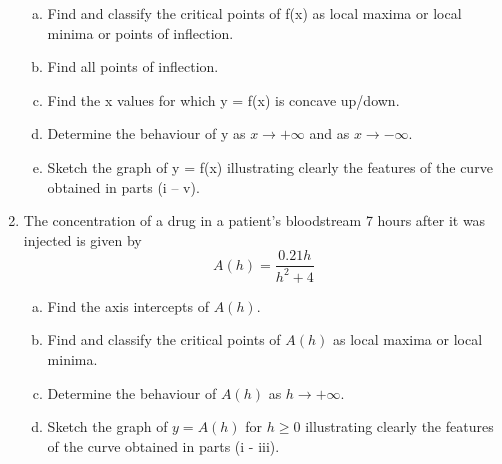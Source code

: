 \documentclass[a4paper,12pt]{article}
\begin{document}
\begin{enumerate}
\begin{enumerate}[(a)]
	\item Find and classify the critical points of f(x) as local maxima or local minima or points of inflection. 
	
	\item Find all points of inflection. 
	
	\item Find the x values for which y = f(x) is concave up/down. 
	
	\item Determine the behaviour of y as $x \to +\infty$ and as $x \to -\infty$. 
	
	\item Sketch the graph of y = f(x) illustrating clearly the features of the curve obtained in parts (i – v). 
\end{enumerate}









\item The concentration of a drug in a patient's bloodstream 7 hours
after it was injected is given by
\[ A(h) = \frac{0.21h}{h^2 +4} \]

\begin{enumerate}[(a)]
	\item  Find the axis intercepts of $A(h)$.
	
	
	\item  Find and classify the critical points of $A(h)$ as local maxima or local minima.
	
	
	\item  Determine the behaviour of $A(h)$ as $h \rightarrow + \infty$.
	
	
	\item  Sketch the graph of $y = A(h)$ for $h \geq 0$ illustrating clearly
	the features of the curve obtained in parts (i - iii).
	
	
	
\end{enumerate}



\end{enumerate}
\end{document}

